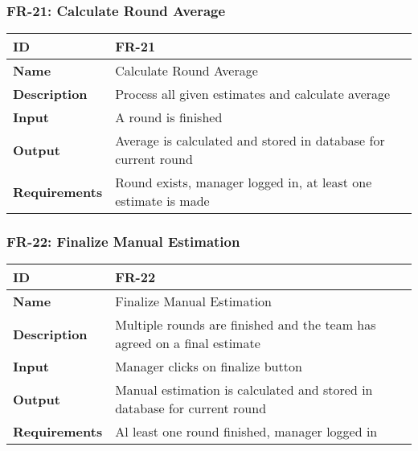     \subsubsection{FR-21: Calculate Round Average}
    \begin{center}
        \begin{tabularx}{\textwidth}{|l|X|}
            \hline
            \textbf{ID} & FR-21 \\
            \hline
            \textbf{Name} & Calculate Round Average \\
            \hline
            \textbf{Description} & Process all given estimates and calculate average \\
            \hline
            \textbf{Input} & A round is finished \\
            \hline
            \textbf{Output} & Average is calculated and stored in database for current round \\
            \hline
            \textbf{Requirements} & Round exists, manager logged in, at least one estimate is made \\
            \hline
        \end{tabularx}
    \end{center}
    
    

    \subsubsection{FR-22: Finalize Manual Estimation}
    \begin{center}
        \begin{tabularx}{\textwidth}{|l|X|}
            \hline
            \textbf{ID} & FR-22 \\
            \hline
            \textbf{Name} & Finalize Manual Estimation \\
            \hline
            \textbf{Description} & Multiple rounds are finished and the team has agreed on a final estimate \\
            \hline
            \textbf{Input} & Manager clicks on finalize button \\
            \hline
            \textbf{Output} & Manual estimation is calculated and stored in database for current round \\
            \hline
            \textbf{Requirements} & Al least one round finished, manager logged in \\
            \hline
        \end{tabularx}
    \end{center}
    
